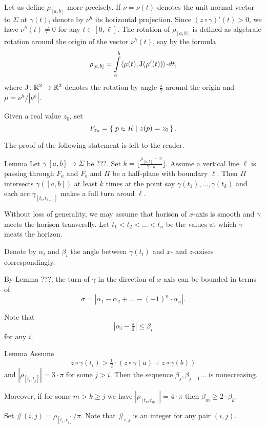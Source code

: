 \documentclass[a4paper,10pt]{amsart}
\begin{document}
Let us define $\rho_{[a,b]}$ more precisely.
If $\nu=\nu(t)$ denotes the unit normal vector to $\Sigma$ at $\gamma(t)$,
denote by $\nu^h$ its horizontal projection.
Since $(z\circ\gamma)'(t)>0$, 
we have $\nu^h(t)\ne0$ for any $t\in [0,\ell]$.
The rotation of $\rho_{[a,b]}$  is defined as
algebraic rotation around the origin of the vector $\nu^h(t)$, 
say by the formula 
\[\rho_{[a,b]}
=
\int\limits_a^b \<\mu(t),\mathrm{J}(\mu'(t))\>\cdot dt,\]
where $\mathrm{J}\colon\mathbb{R}^2\to\mathbb{R}^2$ denotes the rotation by angle $\tfrac\pi 2$ around the origin and $\mu=\nu^h/|\nu^h|$.

Given a real value $z_0$, set 
\[F_{z_0}=\set{p\in K}{z(p)=z_0}.\]

The proof of the following statement is left to the reader.

\begin{thm}{Lemma}
Let $\gamma\:[a,b]\to\Sigma$ be ???.
Set $k=\lfloor \tfrac{\rho_{[a,b]}-\pi}{2\cdot\pi}\rfloor$.
Assume a vertical line $\ell$ is passing through $F_a$ and $F_b$
and $\Pi$ be a half-plane with boundary $\ell$.
Then $\Pi$
intersects $\gamma([a,b])$ at least $k$ times
at the point say $\gamma(t_1), \dots,\gamma(t_k)$
and each arc $\gamma_{[t_i,t_{i+1}]}$ makes a full turn aroud $\ell$.
\end{thm}

Without loss of generality, we may assume that horison of $x$-axis is smooth and $\gamma$ meets the horison tranverslly.
Let $t_1<t_2<\dots<t_n$
be the values at which $\gamma$ meats the horizon.

Denote by $\alpha_i$ and $\beta_i$
the angle between $\dot\gamma(t_i)$ and $x$- and $z$-axises correspondingly.

By Lemma ???, the turn of $\gamma$ in the direction of $x$-axis
can be bounded in terms of 
\[\sigma=|\alpha_1-\alpha_2+\dots-(-1)^n\cdot\alpha_n|.\]

Note that 
\[|\alpha_i-\tfrac\pi2|\le \beta_i\]
for any $i$.



\begin{thm}{Lemma}
Assume \[z\circ\gamma(t_i)>\tfrac12\cdot(z\circ\gamma(a)+z\circ\gamma(b))\]
and $|\rho_{[t_i,t_j]}|=3\cdot \pi$ for some $j>i$.
Then the sequence $\beta_j,\beta_{j+1}\dots$ is nonecreasing.

Moreover, if for some $m>k\ge j$ we have $|\rho_{[t_k,t_m]}|=4\cdot \pi$ then 
$\beta_m\ge 2\cdot \beta_k$.
\end{thm}

Set $\#(i,j)=\rho_{[t_i,t_j]}/\pi$.
Note that $\#_{i,j}$ is an integer for any pair $(i,j)$.
\end{document}
